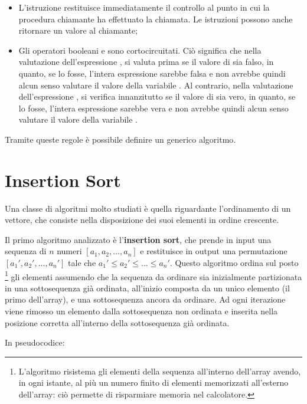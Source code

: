 \begin{itemize}
  \item L'istruzione  restituisce immediatamente il controllo al punto in cui la procedura chiamante ha effettuato la chiamata. Le istruzioni  possono anche ritornare un valore al chiamante;
  \item Gli operatori booleani  e  sono cortocircuitati. Ciò significa che nella valutazione dell'espressione , si valuta prima se il valore di  sia falso, in quanto, se lo fosse, l'intera espressione sarebbe falsa e non avrebbe quindi alcun senso valutare il valore della variabile . Al contrario, nella valutazione dell'espressione , si verifica innanzitutto se il valore di  sia vero, in quanto, se lo fosse, l'intera espressione sarebbe vera e non avrebbe quindi alcun senso valutare il valore della variabile .
\end{itemize}

Tramite queste regole è possibile definire un generico algoritmo.

\section{Insertion Sort}
Una classe di algoritmi molto studiati è quella riguardante l'ordinamento di un vettore, che consiste nella disposizione dei suoi elementi in ordine crescente.

\vspace{10pt}

Il primo algoritmo analizzato è l'\textbf{insertion sort}, che prende in input una sequenza di \(n\) numeri \([a_1, a_2, ...,a_n]\) e restituisce in output una permutazione \([a_1', a_2',...,a_n']\) tale che \(a_1'\le a_2' \le ... \le a_n'\). Questo algoritmo ordina sul posto \footnote{L'algoritmo risistema gli elementi della sequenza all'interno dell'array avendo, in ogni istante, al più un numero finito di elementi memorizzati all'esterno dell'array: ciò permette di risparmiare memoria nel calcolatore.} gli elementi assumendo che la sequenza da ordinare sia inizialmente partizionata in una sottosequenza già ordinata, all'inizio composta da un unico elemento (il primo dell'array), e una sottosequenza ancora da ordinare. Ad ogni iterazione viene rimosso un elemento dalla sottosequenza non ordinata e inserita nella posizione corretta all'interno della sottosequenza già ordinata. 

In pseudocodice:



